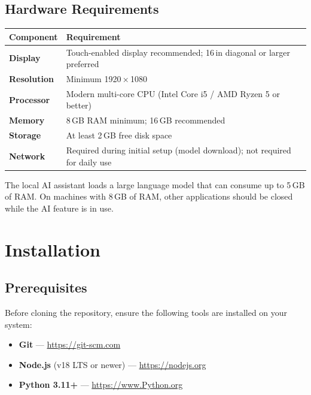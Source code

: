 \documentclass[a4paper,12pt]{article}
\begin{document}
\subsection{Hardware Requirements}
 
\begin{center}
\begin{tabular}{>{\bfseries}p{4cm} p{9cm}}
\toprule
Component & Requirement \\
\midrule
Display            & Touch-enabled display recommended; 16\,in diagonal or larger preferred \\
Resolution         & Minimum 1920\,×\,1080 \\
Processor          & Modern multi-core CPU (Intel Core i5 / AMD Ryzen 5 or better) \\
Memory             & 8\,GB RAM minimum; 16\,GB recommended \\
Storage            & At least 2\,GB free disk space \\
Network            & Required during initial setup (model download); not required for daily use \\
\bottomrule
\end{tabular}
\end{center}
 
\begin{warnbox}
The local AI assistant loads a large language model that can consume up to 5\,GB of RAM. On machines with 8\,GB of RAM, other applications should be closed while the AI feature is in use.
\end{warnbox}
 
\section{Installation}
 
\subsection{Prerequisites}
 
Before cloning the repository, ensure the following tools are installed on your system:
 
\begin{itemize}[leftmargin=1.5em]
    \item \textbf{Git} — \url{https://git-scm.com}
    \item \textbf{Node.js} (v18 LTS or newer) — \url{https://nodejs.org}
    \item \textbf{Python 3.11+} — \url{https://www.Python.org}
\end{itemize}
 
\end{document}
